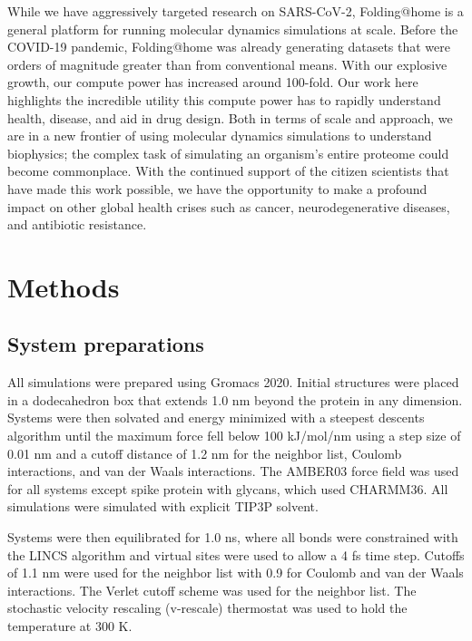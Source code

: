 \documentclass[../main.tex]{subfiles}
\begin{document}
        While we have aggressively targeted research on SARS-CoV-2, Folding@home is a general platform for running molecular dynamics simulations at scale. Before the COVID-19 pandemic, Folding@home was already generating datasets that were orders of magnitude greater than from conventional means. With our explosive growth, our compute power has increased around 100-fold. Our work here highlights the incredible utility this compute power has to rapidly understand health, disease, and aid in drug design. Both in terms of scale and approach, we are in a new frontier of using molecular dynamics simulations to understand biophysics; the complex task of simulating an organism’s entire proteome could become commonplace. With the continued support of the citizen scientists that have made this work possible, we have the opportunity to make a profound impact on other global health crises such as cancer, neurodegenerative diseases, and antibiotic resistance.

    \section{Methods}
    \subsection{System preparations}
        All simulations were prepared using Gromacs 2020\cite{Abraham:2015gj}. Initial structures were placed in a dodecahedron box that extends 1.0 nm beyond the protein in any dimension. Systems were then solvated and energy minimized with a steepest descents algorithm until the maximum force fell below 100 kJ/mol/nm using a step size of 0.01 nm and a cutoff distance of 1.2 nm for the neighbor list, Coulomb interactions, and van der Waals interactions. The AMBER03 force field was used for all systems except spike protein with glycans, which used CHARMM36\cite{Duan:2003gt,huang_charmm36_2013}. All simulations were simulated with explicit TIP3P solvent\cite{Jorgensen:1983fl}.
        
        Systems were then equilibrated for 1.0 ns, where all bonds were constrained with the LINCS algorithm and virtual sites were used to allow a 4 fs time step\cite{Feenstra:1999ue,Hess:2008fl}. Cutoffs of 1.1 nm were used for the neighbor list with 0.9 for Coulomb and van der Waals interactions. The Verlet cutoff scheme was used for the neighbor list. The stochastic velocity rescaling (v-rescale) thermostat was used to hold the temperature at 300 K\cite{Bussi:2007cs}.
\end{document}
